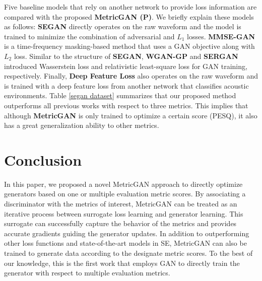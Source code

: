 \documentclass{article}
\begin{document}
Five baseline models that rely on another network to provide loss information are compared with the proposed \textbf{MetricGAN (P)}. We briefly explain these models as follows: \textbf{SEGAN} \cite{pascual2017segan} directly operates on the raw waveform and the model is trained to minimize the combination of adversarial and $L_1$ losses. \textbf{MMSE-GAN} \cite{ soni2018time} is a time-frequency masking-based method that uses a GAN objective along with $L_2$ loss. Similar to the structure of \textbf{SEGAN}, \textbf{WGAN-GP} and \textbf{SERGAN} \cite{baby2019sergan} introduced Wasserstein loss and relativistic least-square loss for GAN training, respectively.
Finally, \textbf{Deep Feature Loss}  \cite{germain2018speech} also operates on the raw waveform and is trained with a deep feature loss from another network that classifies acoustic environments. Table \ref{segan dataset} summarizes that our proposed method outperforms all previous works with respect to three metrics. This implies that although \textbf{MetricGAN} is only trained to optimize a certain score (PESQ), it also has a great generalization ability to other metrics.



\section{Conclusion}
In this paper, we proposed a novel MetricGAN approach to directly optimize generators based on one or multiple evaluation metric scores. By associating a discriminator with the metrics of interest, MetricGAN can be treated as an iterative process between surrogate loss learning and generator learning. This surrogate can successfully capture the behavior of the metrics and provides accurate gradients guiding the generator updates. In addition to outperforming other loss functions and state-of-the-art models in SE, MetricGAN can also be trained to generate data according to the designate metric scores. To the best of our knowledge, this is the first work that employs GAN to directly train the generator with respect to multiple evaluation metrics.










\nocite{langley00}



\end{document}
